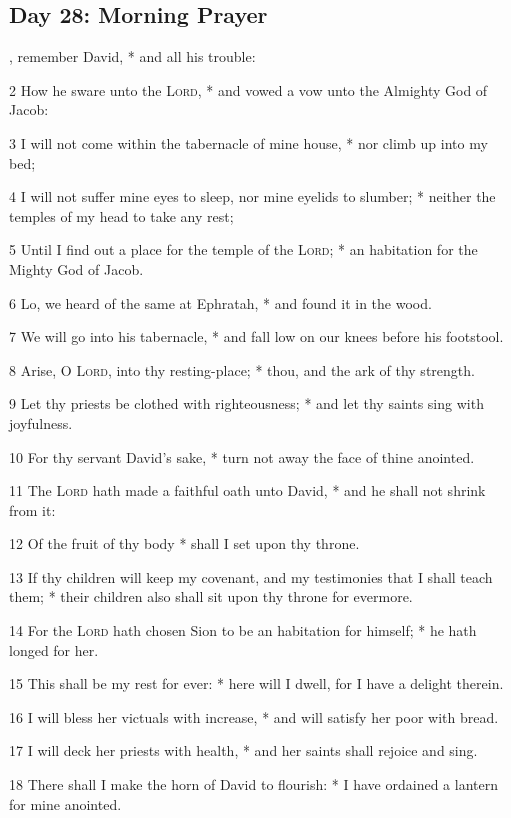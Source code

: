 \subsection{Day 28: Morning Prayer}
, remember David, * and all his trouble:\par
2 How he sware unto the {\textsc{Lord}}, * and vowed a vow unto the Almighty God of Jacob:\par
3 I will not come within the tabernacle of mine house, * nor climb up into my bed;\par
4 I will not suffer mine eyes to sleep, nor mine eyelids to slumber; * neither the temples of my head to take any rest;\par
5 Until I find out a place for the temple of the {\textsc{Lord}}; * an habitation for the Mighty God of Jacob.\par
6 Lo, we heard of the same at Ephratah, * and found it in the wood.\par
7 We will go into his tabernacle, * and fall low on our knees before his footstool.\par
8 Arise, O {\textsc{Lord}}, into thy resting-place; * thou, and the ark of thy strength.\par
9 Let thy priests be clothed with righteousness; * and let thy saints sing with joyfulness.\par
10 For thy servant David's sake, * turn not away the face of thine anointed.\par
11 The {\textsc{Lord}} hath made a faithful oath unto David, * and he shall not shrink from it:\par
12 Of the fruit of thy body * shall I set upon thy throne.\par
13 If thy children will keep my covenant, and my testimonies that I shall teach them; * their children also shall sit upon thy throne for evermore.\par
14 For the \textsc{Lord} hath chosen Sion to be an habitation for himself; * he hath longed for her.\par
15 This shall be my rest for ever: * here will I dwell, for I have a delight therein.\par
16 I will bless her victuals with increase, * and will satisfy her poor with bread.\par
17 I will deck her priests with health, * and her saints shall rejoice and sing.\par
18 There shall I make the horn of David to flourish: * I have ordained a lantern for mine anointed.\par
